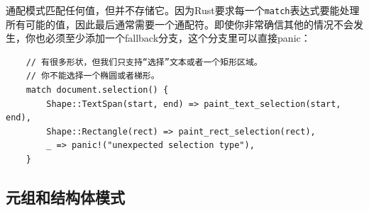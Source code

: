 通配模式匹配任何值，但并不存储它。因为Rust要求每一个\texttt{match}表达式要能处理所有可能的值，因此最后通常需要一个通配符。即使你非常确信其他的情况不会发生，你也必须至少添加一个fallback分支，这个分支里可以直接panic：
\begin{verbatim}
    // 有很多形状，但我们只支持“选择”文本或者一个矩形区域。
    // 你不能选择一个椭圆或者梯形。
    match document.selection() {
        Shape::TextSpan(start, end) => paint_text_selection(start, end),
        Shape::Rectangle(rect) => paint_rect_selection(rect),
        _ => panic!("unexpected selection type"),
    }
\end{verbatim}

\subsection{元组和结构体模式}
